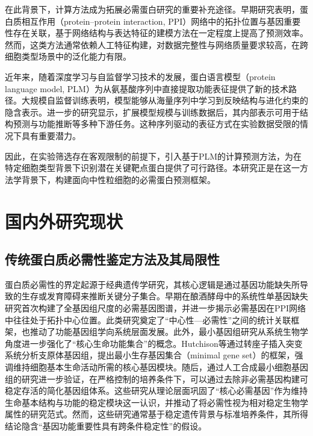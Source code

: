 在此背景下，计算方法成为拓展必需蛋白研究的重要补充途径。早期研究表明，蛋白质相互作用（protein--protein interaction, PPI）网络中的拓扑位置与基因重要性存在关联\cite{jeong2001lethality}，基于网络结构与表达特征的建模方法在一定程度上提高了预测效率。然而，这类方法通常依赖人工特征构建，对数据完整性与网络质量要求较高，在跨细胞类型场景中的泛化能力有限。

近年来，随着深度学习与自监督学习技术的发展，蛋白语言模型（protein language model, PLM）为从氨基酸序列中直接提取功能表征提供了新的技术路径。大规模自监督训练表明，模型能够从海量序列中学习到反映结构与进化约束的隐含表示\cite{rives2021biological}。进一步的研究显示，扩展模型规模与训练数据后，其内部表示可用于结构预测与功能推断等多种下游任务\cite{lin2023evolutionary}。这种序列驱动的表征方式在实验数据受限的情况下具有重要潜力。

因此，在实验筛选存在客观限制的前提下，引入基于PLM的计算预测方法，为在特定细胞类型背景下识别潜在关键靶点蛋白提供了可行路径。本研究正是在这一方法学背景下，构建面向中性粒细胞的必需蛋白预测框架。

\section{国内外研究现状}

\subsection{传统蛋白质必需性鉴定方法及其局限性}

蛋白质必需性的界定起源于经典遗传学研究，其核心逻辑是通过基因功能缺失所导致的生存或发育障碍来推断关键分子集合。早期在酿酒酵母中的系统性单基因缺失研究首次构建了全基因组尺度的必需基因图谱\cite{giaever2002functional}，并进一步揭示必需基因在PPI网络中往往处于拓扑中心位置。此类研究奠定了“中心性—必需性”之间的统计关联框架，也推动了功能基因组学向系统层面发展。此外，最小基因组研究从系统生物学角度进一步强化了“核心生命功能集合”的概念。Hutchison等通过转座子插入突变系统分析支原体基因组，提出最小生存基因集合（minimal gene set）的框架，强调维持细胞基本生命活动所需的核心基因模块\cite{hutchison1999global}。随后，通过人工合成最小细胞基因组的研究进一步验证，在严格控制的培养条件下，可以通过去除非必需基因构建可稳定存活的简化基因组体系\cite{hutchison2016design}。这些研究从理论层面巩固了“核心必需基因”作为维持生命基本结构与功能的稳定模块这一认识，并推动了将必需性视为相对稳定生物学属性的研究范式。然而，这些研究通常基于稳定遗传背景与标准培养条件，其所得结论隐含“基因功能重要性具有跨条件稳定性”的假设。

